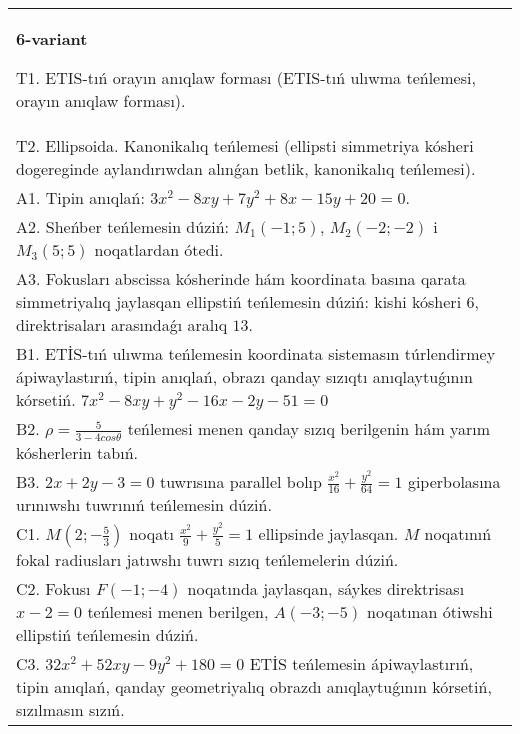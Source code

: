 \documentclass{article}
\begin{document}
\begin{tabular}{m{17cm}}
\textbf{6-variant}
\newline

T1. ETIS-tıń orayın anıqlaw forması (ETIS-tıń ulıwma teńlemesi, orayın anıqlaw forması).\\

T2. Ellipsoida. Kanonikalıq teńlemesi (ellipsti simmetriya kósheri dogereginde aylandırıwdan alınǵan betlik, kanonikalıq teńlemesi).\\

A1. Tipin anıqlań: $3 x^{2}-8 xy+7 y^{2}+8 x-15 y+20=0$.\\

A2. Sheńber teńlemesin dúziń: $M_1 (-1;5) $, $M_2 (-2;-2) $ i $M_3 (5;5) $ noqatlardan ótedi.\\

A3. Fokusları abscissa kósherinde hám koordinata basına qarata simmetriyalıq jaylasqan ellipstiń teńlemesin dúziń: kishi kósheri $6$, direktrisaları arasındaǵı aralıq $13$.\\

B1. ETİS-tıń ulıwma teńlemesin koordinata sistemasın túrlendirmey ápiwaylastırıń, tipin anıqlań, obrazı qanday sızıqtı anıqlaytuǵının kórsetiń. $7x^{2} - 8xy + y^{2} - 16x - 2y - 51 = 0$  \\

B2. $\rho = \frac{5}{3 - 4cos\theta}$ teńlemesi menen qanday sızıq berilgenin hám yarım kósherlerin tabıń.  \\

B3. $2x + 2y - 3 = 0$ tuwrısına parallel bolıp $\frac{x^{2}}{16} + \frac{y^{2}}{64} = 1$ giperbolasına urınıwshı tuwrınıń teńlemesin dúziń.  \\

C1. $M(2; - \frac{5}{3})$ noqatı $\frac{x^{2}}{9} + \frac{y^{2}}{5} = 1$ ellipsinde jaylasqan. $M$ noqatınıń fokal radiusları jatıwshı tuwrı sızıq teńlemelerin dúziń.  \\

C2. Fokusı $F( - 1; - 4)$ noqatında jaylasqan, sáykes direktrisası $x - 2 = 0$ teńlemesi menen berilgen, $A( - 3; - 5)$ noqatınan ótiwshi ellipstiń teńlemesin dúziń.  \\

C3. $32x^{2} + 52xy - 9y^{2} + 180 = 0$ ETİS teńlemesin ápiwaylastırıń, tipin anıqlań, qanday geometriyalıq obrazdı anıqlaytuǵının kórsetiń, sızılmasın sızıń.  \\

\end{tabular}
\vspace{1cm}
\end{document}
